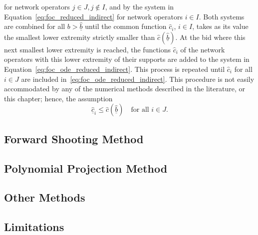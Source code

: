 for network operators $j\in J, j\not\in I$, and by the system in Equation~\eqref{eq:foc_reduced_indirect} for network operators $i\in I$. Both systems are combined for all $b > \underline{\hat{b}}$ until the common function $\hat{c}_i$, $i\in I$, takes as its value the smallest lower extremity strictly smaller than $\hat{c}(\underline{\hat{b}})$. At the bid where this next smallest lower extremity is reached, the functions $\hat{c}_i$ of the network operators with this lower extremity of their supports are added to the system in Equation~\eqref{eq:foc_ode_reduced_indirect}. This process is repeated until $\hat{c}_i$ for all $i\in J$ are included in~\eqref{eq:foc_ode_reduced_indirect}. This procedure is not easily accommodated by any of the numerical methods described in the literature, or this chapter; hence, the assumption
\begin{equation*}
  \underline{\hat{c}}_i \leq \hat{c}(\underline{\hat{b}}) \quad\text{for all } i\in J.
\end{equation*}

\subsection{Forward Shooting Method} %
\label{sub:forward_shooting_method_indirect}


\subsection{Polynomial Projection Method} %
\label{sub:polynomial_projection_method_indirect}


\subsection{Other Methods} %
\label{sub:other_methods_indirect}


\subsection{Limitations} %
\label{sub:limitations_indirect}


